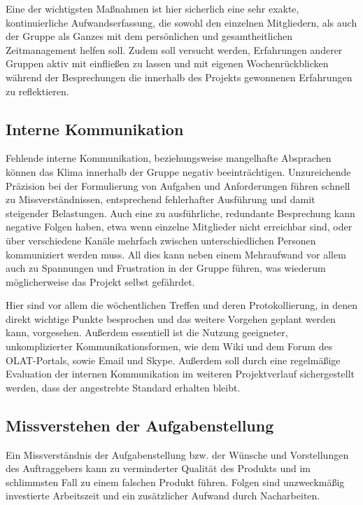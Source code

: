 \massnamen
  Eine der wichtigsten Maßnahmen ist hier sicherlich eine sehr exakte, kontinuierliche Aufwandserfassung, die sowohl den einzelnen Mitgliedern, als auch der Gruppe als Ganzes mit dem persönlichen und gesamtheitlichen Zeitmanagement helfen soll.
  Zudem soll versucht werden, Erfahrungen anderer Gruppen aktiv mit einfließen zu lassen und mit eigenen Wochenrückblicken während der Besprechungen die innerhalb des Projekts ge\-won\-nenen Erfahrungen zu reflektieren.
  

\subsection{Interne Kommunikation}\label{r2}
  Fehlende interne Kommunikation, beziehungsweise mangelhafte Absprachen können das Klima innerhalb der Gruppe negativ beeinträchtigen. Unzureichende Präzision bei der Formulierung von Aufgaben und Anforderungen führen schnell zu Missverständnissen, entsprechend fehlerhafter Ausführung und damit steigender Belastungen. Auch eine zu ausführliche, redundante Besprechung kann negative Folgen haben, etwa wenn einzelne Mitglieder nicht erreichbar sind, oder über verschiedene Kanäle mehrfach zwischen unterschiedlichen Personen kommuniziert werden muss. All dies kann neben einem Mehr\-auf\-wand vor allem auch zu Spannungen und Frustration in der Gruppe führen, was wiederum möglicherweise das Projekt selbst gefährdet.
  
\massnamen
  Hier sind vor allem die wöchentlichen Treffen und deren Protokollierung, in denen direkt wichtige Punkte besprochen und das weitere Vorgehen geplant werden kann, vorgesehen. Außerdem essentiell ist die Nutzung geeigneter, unkomplizierter Kommunikationsformen, wie dem Wiki und dem Forum des OLAT-Portals, sowie Email und Skype. Außerdem soll durch eine regelmäßige Evaluation der internen Kommunikation im weiteren Projektverlauf sichergestellt werden, dass der angestrebte Standard erhalten bleibt.



\subsection{Missverstehen der Aufgabenstellung}\label{r8}
  Ein Missverständnis der Aufgabenstellung bzw. der Wünsche und Vorstellungen des Auftraggebers kann zu verminderter Qualität des Produkts und im schlimmsten Fall zu einem falschen Produkt führen. Folgen sind unzweckmäßig investierte Arbeitszeit und ein zusätzlicher Aufwand durch Nacharbeiten.

